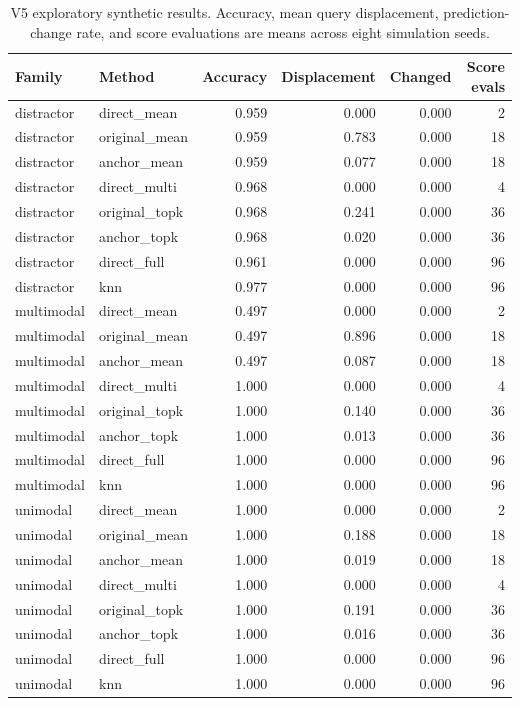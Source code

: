 \begin{table}[t]
\centering
\scriptsize
\setlength{\tabcolsep}{3.5pt}
\caption{V5 exploratory synthetic results. Accuracy, mean query displacement, prediction-change rate, and score evaluations are means across eight simulation seeds.}
\label{tab:v5-results}
\begin{tabular}{llrrrr}
\toprule
Family & Method & Accuracy & Displacement & Changed & Score evals \\
\midrule
distractor & direct\_mean & 0.959 & 0.000 & 0.000 & 2 \\
distractor & original\_mean & 0.959 & 0.783 & 0.000 & 18 \\
distractor & anchor\_mean & 0.959 & 0.077 & 0.000 & 18 \\
distractor & direct\_multi & 0.968 & 0.000 & 0.000 & 4 \\
distractor & original\_topk & 0.968 & 0.241 & 0.000 & 36 \\
distractor & anchor\_topk & 0.968 & 0.020 & 0.000 & 36 \\
distractor & direct\_full & 0.961 & 0.000 & 0.000 & 96 \\
distractor & knn & 0.977 & 0.000 & 0.000 & 96 \\
\midrule
multimodal & direct\_mean & 0.497 & 0.000 & 0.000 & 2 \\
multimodal & original\_mean & 0.497 & 0.896 & 0.000 & 18 \\
multimodal & anchor\_mean & 0.497 & 0.087 & 0.000 & 18 \\
multimodal & direct\_multi & 1.000 & 0.000 & 0.000 & 4 \\
multimodal & original\_topk & 1.000 & 0.140 & 0.000 & 36 \\
multimodal & anchor\_topk & 1.000 & 0.013 & 0.000 & 36 \\
multimodal & direct\_full & 1.000 & 0.000 & 0.000 & 96 \\
multimodal & knn & 1.000 & 0.000 & 0.000 & 96 \\
\midrule
unimodal & direct\_mean & 1.000 & 0.000 & 0.000 & 2 \\
unimodal & original\_mean & 1.000 & 0.188 & 0.000 & 18 \\
unimodal & anchor\_mean & 1.000 & 0.019 & 0.000 & 18 \\
unimodal & direct\_multi & 1.000 & 0.000 & 0.000 & 4 \\
unimodal & original\_topk & 1.000 & 0.191 & 0.000 & 36 \\
unimodal & anchor\_topk & 1.000 & 0.016 & 0.000 & 36 \\
unimodal & direct\_full & 1.000 & 0.000 & 0.000 & 96 \\
unimodal & knn & 1.000 & 0.000 & 0.000 & 96 \\
\bottomrule
\end{tabular}
\end{table}

